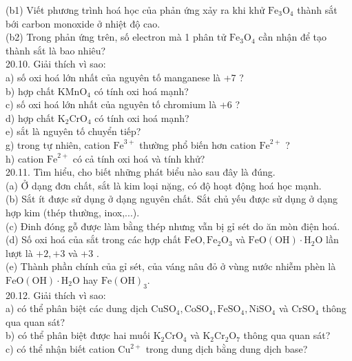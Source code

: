 \documentclass[10pt]{article}
\begin{document}
(b1) Viết phương trình hoá học của phản ứng xảy ra khi khử $\mathrm{Fe}_{3} \mathrm{O}_{4}$ thành sắt bới carbon monoxide ở nhiệt độ cao.\\
(b2) Trong phản ứng trên, số electron mà 1 phân tử $\mathrm{Fe}_{3} \mathrm{O}_{4}$ cần nhận để tạo thành sắt là bao nhiêu?\\
20.10. Giải thích vì sao:\\
a) số oxi hoá lớn nhất của nguyên tố manganese là +7 ?\\
b) hợp chất $\mathrm{KMnO}_{4}$ có tính oxi hoá mạnh?\\
c) số oxi hoá lớn nhất của nguyên tố chromium là +6 ?\\
d) hợp chất $\mathrm{K}_{2} \mathrm{CrO}_{4}$ có tính oxi hoá mạnh?\\
e) sắt là nguyên tố chuyển tiếp?\\
g) trong tự nhiên, cation $\mathrm{Fe}^{3+}$ thường phổ biến hơn cation $\mathrm{Fe}^{2+}$ ?\\
h) cation $\mathrm{Fe}^{2+}$ có cả tính oxi hoá và tính khử?\\
20.11. Tìm hiểu, cho biết những phát biểu nào sau đây là đúng.\\
(a) Ở dạng đơn chất, sắt là kim loại nặng, có độ hoạt động hoá học mạnh.\\
(b) Sắt ít được sử dụng ở dạng nguyên chất. Sắt chủ yếu được sử dụng ở dạng hợp kim (thép thường, inox,...).\\
(c) Đinh đóng gỗ được làm bằng thép nhưng vẫn bị gỉ sét do ăn mòn điện hoá.\\
(d) Số oxi hoá của sắt trong các hợp chất $\mathrm{FeO}, \mathrm{Fe}_{2} \mathrm{O}_{3}$ và $\mathrm{FeO}(\mathrm{OH}) \cdot \mathrm{H}_{2} \mathrm{O}$ lần lượt là $+2,+3$ và +3 .\\
(e) Thành phần chính của gỉ sét, của váng nâu đỏ ở vùng nước nhiễm phèn là $\mathrm{FeO}(\mathrm{OH}) \cdot \mathrm{H}_{2} \mathrm{O}$ hay $\mathrm{Fe}(\mathrm{OH})_{3}$.\\
20.12. Giải thích vì sao:\\
a) có thể phân biệt các dung dịch $\mathrm{CuSO}_{4}, \mathrm{CoSO}_{4}, \mathrm{FeSO}_{4}, \mathrm{NiSO}_{4}$ và $\mathrm{CrSO}_{4}$ thông qua quan sát?\\
b) có thể phân biệt được hai muối $\mathrm{K}_{2} \mathrm{CrO}_{4}$ và $\mathrm{K}_{2} \mathrm{Cr}_{2} \mathrm{O}_{7}$ thông qua quan sát?\\
c) có thể nhận biết cation $\mathrm{Cu}^{2+}$ trong dung dịch bằng dung dịch base?\\
\end{document}
